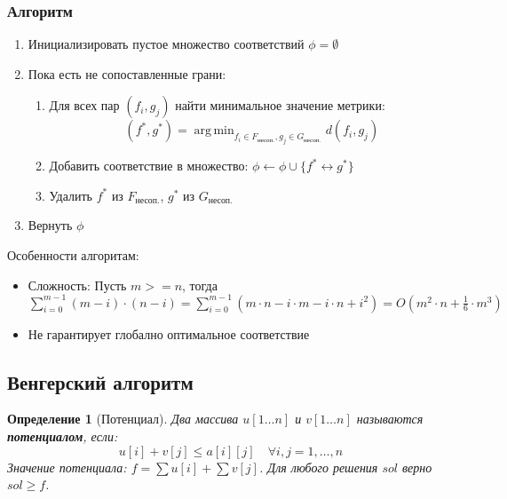 \documentclass[a4paper,14pt]{extarticle}
\newtheorem{definition}{Определение}
\DeclareMathOperator*{\argmin}{arg\,min}
\begin{document}
\subsubsection{Алгоритм}
\begin{enumerate}
    \item Инициализировать пустое множество соответствий $\phi = \emptyset$
    \item Пока есть не сопоставленные грани:
    \begin{enumerate}
        \item Для всех пар $(f_i, g_j)$ найти минимальное значение метрики:
            \[ (f^*, g^*) = \argmin_{f_i \in F_{\text{несоп.}}, g_j \in G_{\text{несоп.}}} d(f_i, g_j) \]
        \item Добавить соответствие в множество: $\phi \leftarrow \phi \cup \{f^* \leftrightarrow g^*\}$
        \item Удалить $f^*$ из $F_{\text{несоп.}}$, $g^*$ из $G_{\text{несоп.}}$
    \end{enumerate}
    \item Вернуть $\phi$
\end{enumerate}

Особенности алгоритам:
\begin{itemize}
    \item Сложность:\newline
        Пусть $m >= n$, тогда \newline
        $\sum\limits_{i = 0}^{m - 1}(m - i) \cdot (n - i) = \sum\limits_{i = 0}^{m - 1}(m \cdot n - i \cdot m 
        - i \cdot n + i^2) = O(m^2 \cdot n + \frac{1}{6} \cdot m^3)$
    \item Не гарантирует глобално оптимальное соответствие
\end{itemize}


\subsection{Венгерский алгоритм}

\begin{definition}[Потенциал]
Два массива $u[1 \ldots n]$ и $v[1 \ldots n]$ называются \textbf{потенциалом}, если:
\begin{equation*}
u[i] + v[j] \leq a[i][j] \quad \forall i,j = 1,\ldots,n
\end{equation*}
Значение потенциала: $f = \sum u[i] + \sum v[j]$. Для любого решения $sol$ верно $sol \geq f$.
\end{definition}
\end{document}
